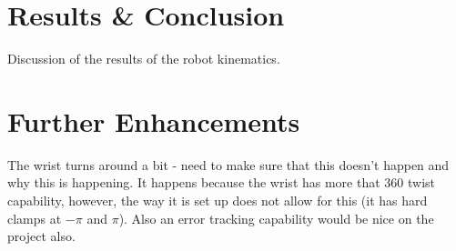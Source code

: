 \documentclass[a4paper]{article}
\begin{document}
\section{Results \& Conclusion}
Discussion of the results of the robot kinematics.

\section{Further Enhancements}
The wrist turns around a bit - need to make sure that this doesn't happen and why this is happening. It happens because the wrist has more that 360 twist capability, however, the way it is set up does not allow for this (it has hard clamps at $-\pi$ and $\pi$). Also an error tracking capability would be nice on the project also.
\end{document}
